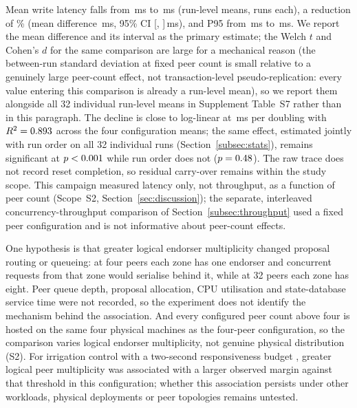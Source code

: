 \documentclass[a4paper,fleqn]{cas-dc}
\begin{document}
Mean write latency falls from \ScaleMinPeerMean\,ms to \ScaleMaxPeerMean\,ms
(run-level means, \PartRunsPerConfig{} runs each), a reduction of
\ScaleLatencyDropPct\% (mean difference \ScaleDiffMs\,ms, 95\% CI
[\ScaleDiffCILow, \ScaleDiffCIHigh]\,ms), and P95 from
\ScaleMinPeerPNinetyFive\,ms to \ScaleMaxPeerPNinetyFive\,ms. We report the
mean difference and its interval as the primary estimate; the Welch $t$
and Cohen's $d$ for the same comparison are large for a mechanical reason
(the between-run standard deviation at fixed peer count is small relative
to a genuinely large peer-count effect, not transaction-level
pseudo-replication: every value entering this comparison is already a
run-level mean), so we report them alongside all 32 individual run-level
means in Supplement Table~S7 rather than in this paragraph. The decline is
close to
log-linear at \ScaleSlope\,ms per doubling with $R^2 = 0.893$
across the four configuration means; the same effect, estimated jointly
with run order on all 32 individual runs (Section~\ref{subsec:stats}),
remains significant at $p<0.001$ while run order does not
($p=0.48$). The raw trace does not record reset completion,
so residual carry-over remains within the study scope. This campaign
measured latency only, not
throughput, as a function of peer count (Scope~S2,
Section~\ref{sec:discussion}); the separate, interleaved
concurrency-throughput comparison of Section~\ref{subsec:throughput} used
a fixed peer configuration and is not informative about peer-count
effects.

One hypothesis is that greater logical endorser multiplicity changed
proposal routing or queueing: at four peers each zone has one endorser and
concurrent requests from that zone would serialise behind it, while at 32
peers each zone has eight. Peer queue depth, proposal allocation, CPU
utilisation and state-database service time were not recorded, so the
experiment does not identify the mechanism behind the association. And
every configured peer count above four is hosted on the same four physical
machines as the four-peer configuration, so the comparison varies logical
endorser multiplicity, not genuine physical distribution (S2). For
irrigation control with a two-second
responsiveness budget \cite{leacox2013wireless}, greater logical peer
multiplicity was associated with a larger observed margin against that
threshold in this configuration; whether this association persists under
other workloads, physical deployments or peer topologies remains
untested.
\end{document}
